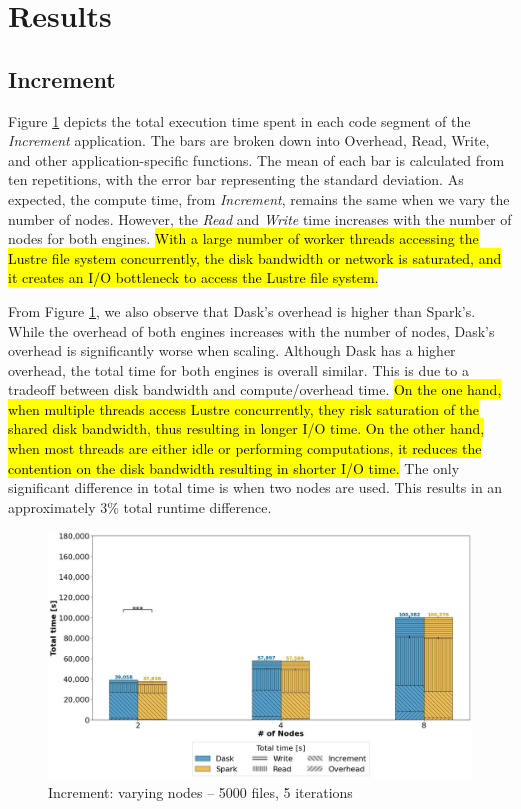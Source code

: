 \documentclass[AMA,STIX1COL]{WileyNJD-v2}
\newcommand{\HL}[1]{\hl{#1}}
\begin{document}
\section{Results}
\subsection{Increment}
Figure \ref{fig:increment_worker} depicts the total execution time spent in each code segment of the \textit{Increment} application.
The bars are broken down into Overhead, Read, Write, and other application-specific functions.
The mean of each bar is calculated from ten repetitions, with the error bar representing the standard deviation.
As expected, the compute time, from \textit{Increment}, remains the same when we vary the number of nodes.
However, the \textit{Read} and \textit{Write} time increases with the number of nodes for both engines.
\HL{
	With a large number of worker threads accessing the Lustre file system
	concurrently, the disk bandwidth or network is saturated, and it creates 
	an I/O bottleneck to access the Lustre file system.
}
												
From Figure \ref{fig:increment_worker}, we also observe that Dask's overhead is higher than Spark's.
While the overhead of both engines increases with the number of nodes, Dask's overhead is significantly worse when scaling.
Although Dask has a higher overhead, the total time for both engines is overall similar.
This is due to a tradeoff between disk bandwidth and compute/overhead time.
\HL{
	On the one hand, when multiple threads access Lustre concurrently, they risk 
	saturation of the shared disk bandwidth, thus resulting in longer I/O time.
	On the other hand, when most threads are either idle or performing computations,
	it reduces the contention on the disk bandwidth resulting in shorter I/O time.
}
The only significant difference in total time is when two nodes are used.
This results in an approximately 3\% total runtime difference.
\begin{figure}[!h]
	\centering
	\includegraphics[clip,width=0.75\columnwidth]{figures/stacked_increment_worker.jpg}
	\caption{Increment: varying nodes -- 5000 files, 5 iterations}
	\label{fig:increment_worker}
\end{figure}
														
\end{document}
